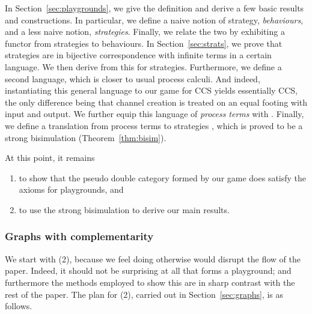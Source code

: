 \documentclass{LMCS}
\theoremstyle{plain}\newtheorem{satz}[thm]{Satz}
\begin{document}
In Section~\ref{sec:playgrounds}, we give the definition and derive a
few basic results and constructions. In particular, we define a naive
notion of strategy, \emph{behaviours}, and a less naive notion,
\emph{strategies}.  Finally, we relate the two by exhibiting a functor
from strategies to behaviours.  In Section~\ref{sec:strats}, we prove
that strategies are in bijective correspondence with infinite terms in
a certain language. We then derive from this \anlts{}  for
strategies.  Furthermore, we define a second language, which is closer
to usual process calculi. And indeed, instantiating this general
language to our game for CCS yields essentially CCS, the only
difference being that channel creation is treated on an equal footing
with input and output. We further equip this language of \emph{process
  terms} with \anlts{} .  Finally, we define a translation
from process terms to strategies , which is proved to be a strong bisimulation
(Theorem~\ref{thm:bisim}).

At this point, it remains 
\begin{enumerate}\enlargethispage{\baselineskip}
\item to show that the pseudo double category  formed by our
  game does satisfy the axioms for playgrounds, and
\item to use the strong bisimulation  to derive our main
  results.
\end{enumerate}

\subsubsection{Graphs with complementarity}
We start with (2), because we feel doing otherwise would disrupt the
flow of the paper. Indeed, it should not be surprising at all that
 forms a playground; and furthermore the methods employed to
show this are in sharp contrast with the rest of the paper.  The plan
for (2), carried out in Section~\ref{sec:graphs}, is as follows.
\end{document}

